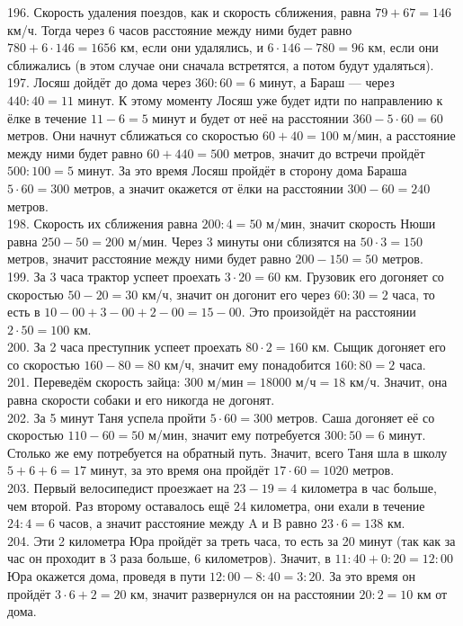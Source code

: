196. Скорость удаления поездов, как и скорость сближения, равна $79+67=146$ км/ч. Тогда через 6 часов расстояние между ними будет равно $780+6\cdot146=1656$ км, если они удалялись, и $6\cdot146-780=96$ км, если они сближались (в этом случае они сначала встретятся, а потом будут удаляться).\\
197. Лосяш дойдёт до дома через $360:60=6$ минут, а Бараш --- через $440:40=11$ минут. К этому моменту Лосяш уже будет идти по направлению к ёлке в течение $11-6=5$ минут и будет от неё на расстоянии $360-5\cdot60=60$ метров. Они начнут сближаться со скоростью $60+40=100$ м/мин, а расстояние между ними будет равно $60+440=500$ метров, значит до встречи пройдёт $500:100=5$ минут. За это время Лосяш пройдёт в сторону дома Бараша $5\cdot60=300$ метров, а значит окажется от ёлки на расстоянии $300-60=240$ метров.\\
198. Скорость их сближения равна $200:4=50$ м/мин, значит скорость Нюши равна $250-50=200$ м/мин. Через 3 минуты они сблизятся на $50\cdot3=150$ метров, значит расстояние между ними будет равно $200-150=50$ метров.\\
199. За 3 часа трактор успеет проехать $3\cdot20=60$ км. Грузовик его догоняет со скоростью $50-20=30$ км/ч, значит он догонит его через $60:30=2$ часа, то есть в $10-00+3-00+2-00=15-00.$ Это произойдёт на расстоянии $2\cdot50=100$ км.\\
200. За 2 часа преступник успеет проехать $80\cdot2=160$ км. Сыщик догоняет его со скоростью $160-80=80$ км/ч, значит ему понадобится $160:80=2$ часа.\\
201. Переведём скорость зайца: $300\text{ м/мин}=18000\text{ м/ч}=18\text{ км/ч.}$ Значит, она равна скорости собаки и его никогда не догонят.\\
202. За 5 минут Таня успела пройти $5\cdot60=300$ метров. Саша догоняет её со скоростью $110-60=50$ м/мин, значит ему потребуется $300:50=6$ минут. Столько же ему потребуется на обратный путь. Значит, всего Таня шла в школу $5+6+6=17$ минут, за это время она пройдёт $17\cdot60=1020$ метров.\\
203. Первый велосипедист проезжает на $23-19=4$ километра в час больше, чем второй. Раз второму оставалось ещё 24 километра, они ехали в течение $24:4=6$ часов, а значит расстояние между A и B равно $23\cdot6=138$ км.\\
204. Эти 2 километра Юра пройдёт за треть часа, то есть за 20 минут (так как за час он проходит в 3 раза больше, 6 километров). Значит, в $11:40+0:20=12:00$ Юра окажется дома, проведя в пути $12:00-8:40=3:20.$ За это время он пройдёт $3\cdot6+2=20$ км, значит развернулся он на расстоянии $20:2=10$ км от дома.\\
